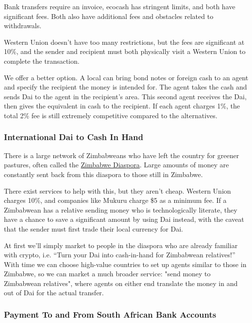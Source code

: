 \documentclass{article}
\begin{document}
Bank transfers require an invoice, ecocash has stringent limits, and both have significant fees. Both also have additional fees and obstacles related to withdrawals.

Western Union doesn't have too many restrictions, but the fees are significant at 10\%, and the sender and recipient must both physically visit a Western Union to complete the transaction.

We offer a better option. A local can bring bond notes or foreign cash to an agent and specify the recipient the money is intended for. The agent takes the cash and sends Dai to the agent in the recipient's area. This second agent receives the Dai, then gives the equivalent in cash to the recipient. If each agent charges 1\%, the total 2\% fee is still extremely competitive compared to the alternatives.

\subsubsection{International Dai to Cash In Hand} \label{remittance}

There is a large network of Zimbabweans who have left the country for greener pastures, often called the \href{https://en.wikipedia.org/wiki/Zimbabwean_diaspora}{Zimbabwe Diaspora}. Large amounts of money are constantly sent back from this diaspora to those still in Zimbabwe.

There exist services to help with this, but they aren't cheap. Western Union charges 10\%, and companies like Mukuru charge \$5 as a minimum fee. If a Zimbabwean has a relative sending money who is technologically literate, they have a chance to save a significant amount by using Dai instead, with the caveat that the sender must first trade their local currency for Dai.

At first we'll simply market to people in the diaspora who are already familiar with crypto, i.e. ``Turn your Dai into cash-in-hand for Zimbabwean relatives!'' With time we can choose high-value countries to set up agents similar to those in Zimbabwe, so we can market a much broader service: "send money to Zimbabwean relatives", where agents on either end translate the money in and out of Dai for the actual transfer.

\subsubsection{Payment To and From South African Bank Accounts} \label{south african accounts}
\end{document}

